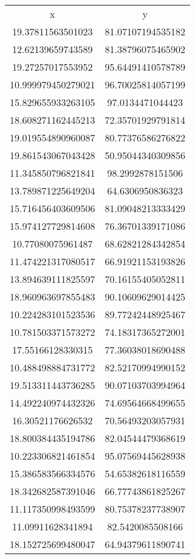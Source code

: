 \begin{table}
\begin{tabular}{cc}
x & y \\
19.37811563501023 & 81.07107194535182 \\
12.62139659743589 & 81.38796075465902 \\
19.27257017553952 & 95.64491410578789 \\
10.999979450279021 & 96.70025814057199 \\
15.829655933263105 & 97.0134471044423 \\
18.608271162445213 & 72.35701929791814 \\
19.019554890960087 & 80.77376586276822 \\
19.861543067043428 & 50.95044340309856 \\
11.345850796821841 & 98.2992878151506 \\
13.789871225649204 & 64.6306950836323 \\
15.716456403609506 & 81.09048213333429 \\
15.974127729814608 & 76.36701339171086 \\
10.77080075961487 & 68.62821284342854 \\
11.474221317080517 & 66.91921153193826 \\
13.894639111825597 & 70.16155405052811 \\
18.960963697855483 & 90.10609629014425 \\
10.224283101523536 & 89.77242448925467 \\
10.781503371573272 & 74.18317365272001 \\
17.55166128330315 & 77.36038018690488 \\
10.488498884731772 & 82.52170994990152 \\
19.513311443736285 & 90.07103703994964 \\
14.492240974432326 & 74.69564668499655 \\
16.30521176626532 & 70.56493203057931 \\
18.800384435194786 & 82.04544479368619 \\
10.223306821461854 & 95.07569445628938 \\
15.386583566334576 & 54.65382618116559 \\
18.342682587391046 & 66.77743861825267 \\
11.117350998493599 & 80.75378237738907 \\
11.09911628341894 & 82.5420085508166 \\
18.152725699480047 & 64.94379611890741 \\

\end{tabular}
\end{table}
